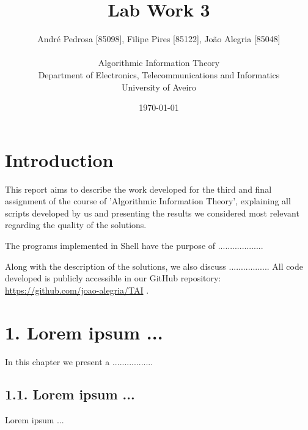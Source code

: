 \documentclass[12pt]{article}
\title{Lab Work 3}
\author
{André Pedrosa [85098], Filipe Pires [85122], João Alegria [85048]\\
\\
Algorithmic Information Theory\\
\normalsize{Department of Electronics, Telecommunications and Informatics}\\
\normalsize{University of Aveiro}\\
}
\date{\today{}}
\begin{document}
 

\baselineskip18pt

\maketitle 

\section*{Introduction}

This report aims to describe the work developed for the third and final assignment
of the course of 'Algorithmic Information Theory', explaining all scripts
developed by us and presenting the results we considered most relevant 
regarding the quality of the solutions. 

The programs implemented in Shell have the purpose of ...................

Along with the description of the solutions, we also discuss .................
All code developed is publicly accessible in our GitHub repository:
\url{https://github.com/joao-alegria/TAI} .
\newpage

\section*{1. Lorem ipsum ...}

In this chapter we present a ................\cite{trab3}.

\subsection*{1.1. Lorem ipsum ...}

Lorem ipsum ...


  
\end{document}
